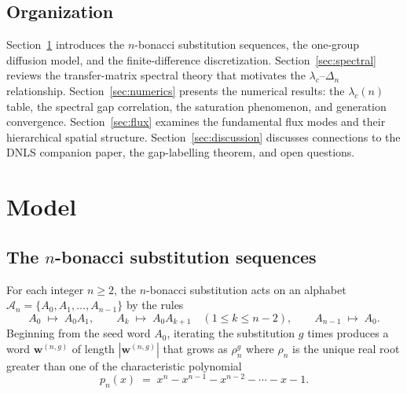 \documentclass[11pt]{article}
\newcommand{\lc}{\lambda_c}
\newcommand{\rhon}{\rho_n}
\begin{document}
\subsection{Organization}

Section~\ref{sec:model} introduces the $n$-bonacci substitution sequences,
the one-group diffusion model, and the finite-difference discretization.
Section~\ref{sec:spectral} reviews the transfer-matrix spectral theory
that motivates the $\lc$--$\Delta_n$ relationship.
Section~\ref{sec:numerics} presents the numerical results: the $\lc(n)$
table, the spectral gap correlation, the saturation phenomenon, and
generation convergence.
Section~\ref{sec:flux} examines the fundamental flux modes and their
hierarchical spatial structure.
Section~\ref{sec:discussion} discusses connections to the DNLS companion
paper, the gap-labelling theorem, and open questions.

\section{Model}
\label{sec:model}

\subsection{The $n$-bonacci substitution sequences}
\label{sec:nbonacci}

For each integer $n \geq 2$, the $n$-bonacci substitution acts on an
alphabet $\mathcal{A}_n = \{A_0, A_1, \ldots, A_{n-1}\}$ by the rules
\begin{equation}
  A_0 \;\mapsto\; A_0 A_1,
  \qquad
  A_k \;\mapsto\; A_0 A_{k+1} \quad (1 \leq k \leq n-2),
  \qquad
  A_{n-1} \;\mapsto\; A_0.
  \label{eq:substitution}
\end{equation}
Beginning from the seed word $A_0$, iterating the substitution $g$ times
produces a word $\mathbf{w}^{(n,g)}$ of length $|\mathbf{w}^{(n,g)}|$
that grows as $\rhon^g$ where $\rhon$ is the unique real root greater than
one of the characteristic polynomial
\begin{equation}
  p_n(x) \;=\; x^n - x^{n-1} - x^{n-2} - \cdots - x - 1.
  \label{eq:charpoly}
\end{equation}
\end{document}
